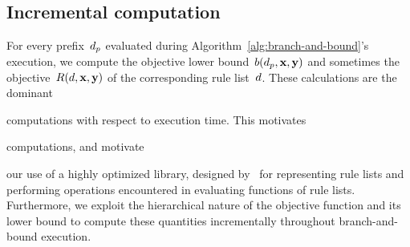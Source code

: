 \begin{arxiv}
\section{Incremental computation}
\label{sec:incremental}
\end{arxiv}

For every prefix~$d_p$ evaluated during
Algorithm~\ref{alg:branch-and-bound}'s execution, we compute
the objective lower bound~${b(d_p, \mathbf{x}, \mathbf{y})}$ and sometimes
the objective~${R({d}, \mathbf{x}, \mathbf{y})}$ of the corresponding rule list~${d}$.
%
These calculations are the dominant
\begin{arxiv}
computations with respect to execution time.
%
This motivates
\end{arxiv}
\begin{kdd}
computations, and motivate
\end{kdd}
our use of a highly optimized library,
designed by~\citet{YangRuSe16} for representing rule lists and
performing operations encountered in evaluating functions of rule lists.
%
Furthermore, we exploit the hierarchical nature of the objective
function and its lower bound to compute these quantities
incrementally throughout branch-and-bound execution.
%

